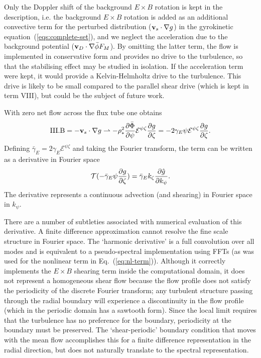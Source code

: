 Only the Doppler shift of the background $E \times B$ rotation is kept in the description, i.e. the
background $E\times B$ rotation is 
added as an additional convective term for the perturbed distribution (${\bf v}_s \cdot \nabla g$) in the gyrokinetic equation~(\ref{eqs:complete-set}), 
and we neglect the acceleration due to the background potential (${\bf v}_D \cdot \nabla \bar{\phi} F_M$). 
By omitting the latter term, the flow is implemented in conservative form and provides no drive to the turbulence, so that the 
stabilising effect may be studied in isolation.  If the acceleration term were kept, it would provide a Kelvin-Helmholtz drive to
the turbulence.  This drive is likely to be small compared to the parallel shear drive (which is kept in term VIII), but could be the subject of future work. 

With zero net flow across the flux tube one obtains
\begin{equation}
{\rm III.B} = -{\bf v}_s \cdot \nabla g \rightharpoonup - \rho_*^2 {\partial \bar{\Phi} \over \partial
\psi}{\mathcal E}^{\psi \zeta}{\partial g \over \partial \zeta} =
 - 2 {\gamma_E \psi}{\mathcal E}^{\psi \zeta}  {\partial g \over \partial \zeta} .
\end{equation}
Defining $\bar \gamma_E= 2 \gamma_E {\mathcal E}^{\psi \zeta} $ and taking the Fourier transform, the term can be written as a derivative in
Fourier space
\begin{equation} 
{\mathcal T}(-{\bar \gamma_E \psi}{\partial g \over \partial \zeta}) = \bar \gamma_E
k_\zeta {\partial \hat g \over \partial k_\psi} .
\end{equation}
The derivative represents a continuous advection (and shearing) in Fourier space in $k_\psi$.  

There are a number of subtleties associated with numerical evaluation of this derivative. A finite difference approximation cannot resolve the fine 
scale structure in Fourier space.  The `harmonic derivative' \cite{Waltz94,Miller94} is a full convolution over all modes and is equivalent to a
pseudo-spectral implementation using FFTs (as was used for the nonlinear term in Eq.~(\ref{eq:nl-term})).  
Although it correctly implements the $E \times B$ shearing term inside the computational domain, it does not represent a homogeneous shear 
flow because the flow profile does not satisfy the periodicity of the discrete Fourier transform; any turbulent structure passing through the radial
boundary will experience a discontinuity in the flow profile (which in the periodic domain has a sawtooth form).  
Since the local limit requires that the turbulence has no preference for the boundary, periodicity at the boundary must be preserved. 
The `shear-periodic' boundary condition \cite{Baron82,Schumann85,Gerz89} that moves with the mean flow accomplishes this for a finite 
difference representation in the radial direction, but does not naturally translate to the spectral representation.

